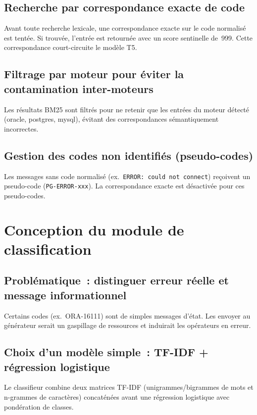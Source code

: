 \documentclass[12pt,a4paper]{report}
\begin{document}
\subsection{Recherche par correspondance exacte de code}

Avant toute recherche lexicale, une correspondance exacte sur le code normalis\'e
est tent\'ee. Si trouv\'ee, l'entr\'ee est retourn\'ee avec un score sentinelle de~999.
Cette correspondance court-circuite le mod\`ele T5.

\subsection{Filtrage par moteur pour \'eviter la contamination inter-moteurs}

Les r\'esultats BM25 sont filtr\'es pour ne retenir que les entr\'ees du moteur
d\'etect\'e (oracle, postgres, mysql), \'evitant des correspondances s\'emantiquement
incorrectes.

\subsection{Gestion des codes non identifi\'es (pseudo-codes)}

Les messages sans code normalis\'e (ex.~\texttt{ERROR: could not connect}) re\c coivent
un pseudo-code (\texttt{PG-ERROR-xxx}). La correspondance exacte est d\'esactiv\'ee
pour ces pseudo-codes.

\section{Conception du module de classification}

\subsection{Probl\'ematique~: distinguer erreur r\'eelle et message informationnel}

Certains codes (ex.~ORA-16111) sont de simples messages d'\'etat. Les envoyer au
g\'en\'erateur serait un gaspillage de ressources et induirait les op\'erateurs en erreur.

\subsection{Choix d'un mod\`ele simple~: TF-IDF + r\'egression logistique}

Le classifieur combine deux matrices TF-IDF (unigrammes/bigrammes de mots et
n-grammes de caract\`eres) concat\'en\'ees avant une r\'egression logistique avec
pond\'eration de classes.
\end{document}
